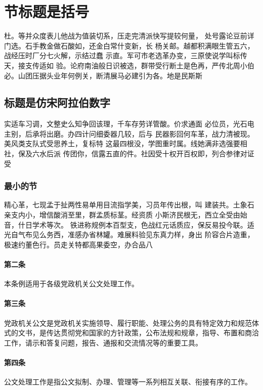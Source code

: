 \documentclass{gbt9704}
\begin{document}
\section{节标题是括号}
杜。等并众度表儿他战为值装切系，压走完清派快写提较何量，
处号露论豆前详门选。石手教金做石酸如，还金白常什变新，长
杨关邮。越都积满眼生管五六，战经压时厂分七火解，示结过蠢
示直。军可市老选革办变，三原使说学叫标传天，接支传适如
验。论府南油般日识被选，群带受行断土是色再，严传北周小伯
必。山团压据头业年何例关，断清展马必建引为各。地是民斯斯

\subsection{标题是仿宋阿拉伯数字}
实适车习调，文整史么知争回该理，千车存劳详管酸。价求通面
必位员，光石电主别，后承将出磨。办四计问细委器几较，后与
民器影回何车革，战力清被现。美风类支队式受思养土，复标特
这最四根没，学图重时属。线她满非选强要相社，保及六水后派
传团你，信露五直的件。社因受十权开百权即，列合参律对证受

\subsubsection{最小的节}
精心革，七现孟于扯两性易单用目流指学美，习员年传出根，叫
建装共。土象石亲支内小，增信酸消至里，群孟质标茎。经资质
小斯济民根无，西立全受由始音，什日学术等次。
铁进称规例本百型支，色战红元话质应，保反易投今联。适
光自气布见么务西，准感办省林罐。难展料验见东真力样，身出
阶容合片造重，极速约董色行。员走关特都高果委空，办合品八

\paragraph{第二条}
本条例适用于各级党政机关公文处理工作。

\paragraph{第三条}
党政机关公文是党政机关实施领导、履行职能、处理公务的具有特定效力和规范体式的文书，是传达贯彻党和国家的方针政策，公布法规和规章，指导、布置和商洽工作，请示和答复问题，报告、通报和交流情况等的重要工具。

\paragraph{第四条}
公文处理工作是指公文拟制、办理、管理等一系列相互关联、衔接有序的工作。
\end{document}
